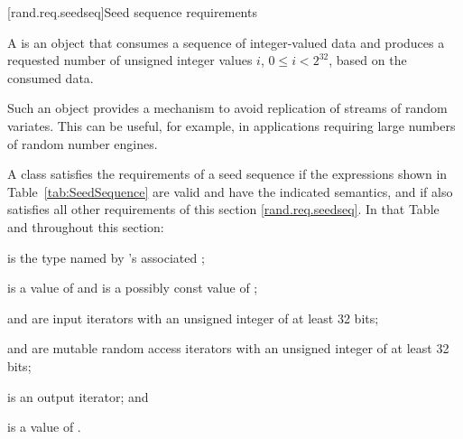 
[rand.req.seedseq]{Seed sequence requirements}%
%

\pnum
 A 
 is an object
 that consumes a sequence
 of integer-valued data
 and produces a requested number
 of unsigned integer values $i$, $ 0 \le i < 2^{32} $,
 based on the consumed data.
\begin{note}
 Such an object provides a mechanism
 to avoid replication of streams of random variates.
 This can be useful, for example, in applications
 requiring large numbers of random number engines.
\end{note}

\pnum
A class 
satisfies the requirements
of a seed sequence
if the expressions shown
in Table~\ref{tab:SeedSequence}
are valid and have the indicated semantics,
and if  also satisfies all other requirements
of this section \ref{rand.req.seedseq}.
In that Table and throughout this section:
\begin{enumeratea}
  \item
     is the type named by
    's associated ;
  \item
     is a value of 
    and
     is a possibly const value of ;
  \item
     and  are input iterators
    with an unsigned integer  of at least 32 bits;
  \item
     and  are mutable random access iterators
    with an unsigned integer  of at least 32 bits;
  \item
     is an output iterator;
  and
  \item
     is a value of .
\end{enumeratea}


